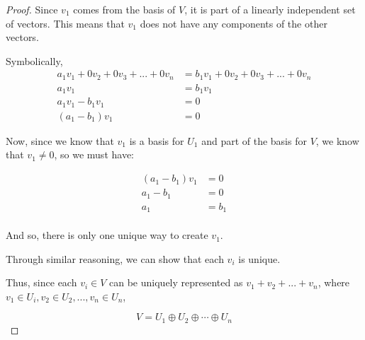 \documentclass[12pt,letterpaper]{article}
\begin{document}
\begin{enumerate}
\begin{proof}
        Since $v_1$ comes from the basis of $V$, it is part of a linearly independent set of vectors.
        This means that $v_1$ does not have any components of the other vectors.

        Symbolically,
        \begin{align*}
          a_1v_1 + 0v_2 + 0v_3 + ... + 0v_n &= b_1v_1 + 0v_2 + 0v_3 + ... + 0v_n \\
          a_1v_1 &= b_1v_1 \\
          a_1v_1 - b_1v_1 &= 0 \\
          (a_1 - b_1)v_1 &= 0
        \end{align*}

        Now, since we know that $v_1$ is a basis for $U_1$ and part of the basis for $V$,
        we know that $v_1 \neq 0$, so we must have:

        \begin{align*}
          (a_1 - b_1)v_1 &= 0 \\
          a_1 - b_1 &= 0 \\
          a_1 &= b_1 \\
        \end{align*}

        And so, there is only one unique way to create $v_1$.

        Through similar reasoning, we can show that each $v_i$ is unique.

        Thus, since each $v_i \in V$ can be uniquely represented as $v_1 + v_2 + ... + v_n$,
        where $v_1 \in U_i, v_2 \in U_2, ..., v_n \in U_n$,

        \[V = U_1 \oplus U_2 \oplus \cdots \oplus U_n\]

      \end{proof}

  \end{enumerate}
\end{document}

